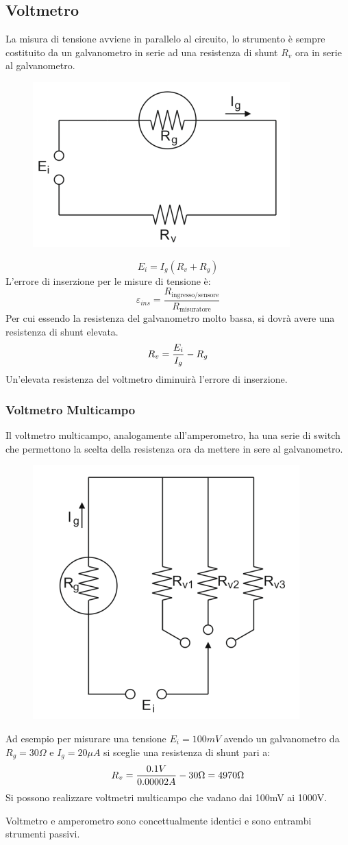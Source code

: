 \documentclass[a4paper, 15pt]{article}
\begin{document}
\subsection{Voltmetro}	
\begin{adjustwidth}{2in}{}		
		La misura di tensione avviene in parallelo al circuito, lo strumento è sempre costituito da un galvanometro in serie ad una resistenza di shunt $R_v$ ora in serie al galvanometro.
\begin{figure}[H]
	\centering
	\includegraphics[width=0.3\linewidth]{fig/screenshot007}

	\label{fig:screenshot007}
\end{figure}
		\[E_i = I_g(R_v + R_g)\]		
		L'errore di inserzione per le misure di tensione è:
		\[\varepsilon_{ins} = \dfrac{R_{\text{ingresso/sensore}}}{R_{\text{misuratore}}}\]
		Per cui essendo la resistenza del galvanometro molto bassa, si dovrà avere una resistenza di shunt elevata. 
		\[R_v = {E_i\over I_g} - R_g\]
		Un'elevata resistenza del voltmetro diminuirà l'errore di inserzione. 
\end{adjustwidth}
\subsubsection{Voltmetro Multicampo}	
\begin{adjustwidth}{2in}{}			
		Il voltmetro multicampo, analogamente all'amperometro, ha una serie di switch che permettono la scelta della resistenza ora da mettere in sere al galvanometro.		
		\begin{figure}[H]
			\centering
			\includegraphics[width=0.3\linewidth]{fig/screenshot008}
			\label{fig:screenshot008}
		\end{figure}		
		Ad esempio per misurare una tensione $E_i = 100 mV$ avendo un galvanometro da $R_g = 30\Omega$ e $I_g = 20\mu A$ si sceglie una resistenza di shunt pari a:
		\[R_v = {0.1V\over 0.00002A} - 30\Omega = 4970\Omega\]
		Si possono realizzare voltmetri multicampo che vadano dai 100mV ai 1000V. \newline 
		
		Voltmetro e amperometro sono concettualmente identici e sono entrambi strumenti passivi.  
\end{adjustwidth}
\end{document}
